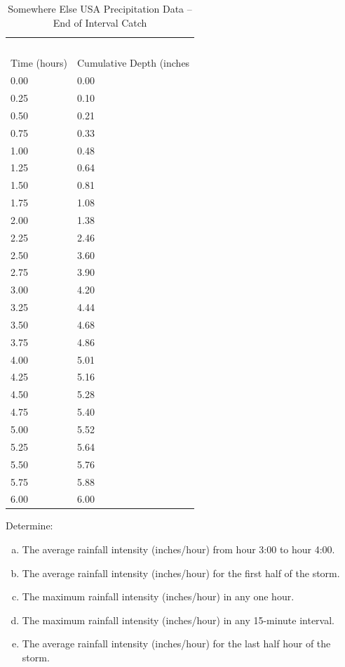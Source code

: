 \documentclass[12pt]{article}
\begin{document}
\begin{enumerate}
\begin{table}[h!]
\centering
\caption{Somewhere Else USA Precipitation Data -- End of Interval Catch}
\begin{tabular}{p{2.0in}p{2.0in}} %
~&~\\
Time (hours) & Cumulative Depth (inches\\
\hline
\hline
0.00 & 0.00 \\
0.25 & 0.10 \\
0.50 & 0.21 \\
0.75 & 0.33 \\
1.00 & 0.48 \\
1.25 & 0.64 \\
1.50 & 0.81 \\
1.75 & 1.08 \\
2.00 & 1.38 \\
2.25 & 2.46 \\
2.50 & 3.60 \\
2.75 & 3.90 \\
3.00 & 4.20 \\
3.25 & 4.44 \\
3.50 & 4.68 \\
3.75 & 4.86 \\
4.00 & 5.01 \\
4.25 & 5.16 \\
4.50 & 5.28 \\
4.75 & 5.40 \\
5.00 & 5.52 \\
5.25 & 5.64 \\
5.50 & 5.76 \\
5.75 & 5.88 \\
6.00 & 6.00 \\
\hline
\end{tabular}
\label{tab:SomewhereElseUSARain}
\end{table}

Determine:
    \begin{enumerate}[a)]
        \item The average rainfall intensity (inches/hour) from hour 3:00 to hour 4:00. 
        \item The average rainfall intensity (inches/hour) for the first half of the storm. 
        \item The maximum rainfall intensity (inches/hour) in any one hour.  
        \item The maximum rainfall intensity (inches/hour) in any 15-minute interval. 
        \item The average rainfall intensity (inches/hour) for the last half hour of the storm.   
    \end{enumerate}


\end{enumerate}
\end{document}
